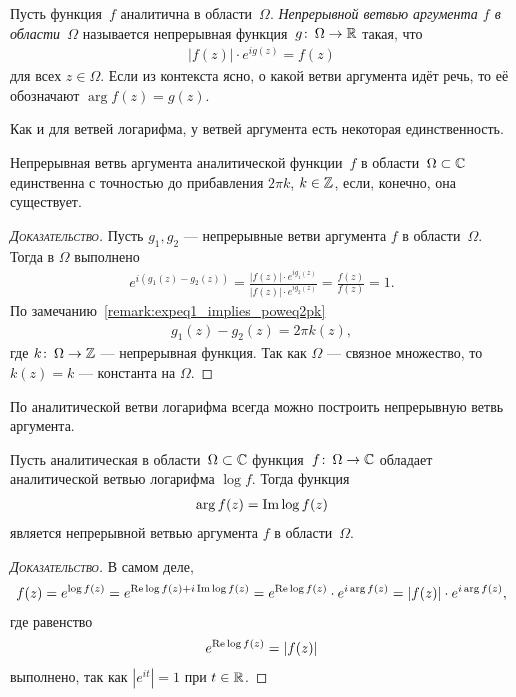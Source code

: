 \documentclass[../complex-analysis.tex]{subfiles}
\begin{document}
\begin{df}
 Пусть функция~$ f $ аналитична в области~$ \Omega $. \textit{Непрерывной ветвью аргумента $ f $ в области~$ \Omega $} называется непрерывная функция~$ g \colon\, \Omega \to \mathbb{R} $ такая, что
 \begin{align*}
  \left| f(z) \right| \cdot e^{i g(z)} = f(z)
 \end{align*} для всех $ z\in\Omega $. Если из контекста ясно, о какой ветви аргумента идёт речь, то её обозначают $ \arg f(z) = g(z) $.
\end{df}

Как и для ветвей логарифма, у ветвей аргумента есть некоторая единственность.

\begin{prop}
 Непрерывная ветвь аргумента аналитической функции~$ f $ в области~$ \Omega \subset \mathbb{C} $ единственна с точностью до прибавления $ 2\pi k $, $ k\in\mathbb{Z} $, если, конечно, она существует.
\end{prop}
\begin{proof}[\normalfont\textsc{Доказательство}]
 Пусть $ g_1,g_2 $ --- непрерывные ветви аргумента $ f $ в области~$ \Omega $. Тогда в $ \Omega $ выполнено
 \begin{align*}
  e^{i(g_1(z) - g_2(z))} = \frac{\left| f(z) \right| \cdot e^{ig_1(z)}}{\left| f(z) \right| \cdot e^{ig_2(z)}} = \frac{f(z)}{f(z)} = 1.
 \end{align*} По замечанию~\ref{remark:expeq1_implies_poweq2pk}
 \begin{align*}
  g_1(z)-g_2(z) = 2\pi k(z),
 \end{align*} где $ k\colon\,\Omega\to\mathbb{Z} $ --- непрерывная функция. Так как $ \Omega $ --- связное множество, то $ k(z) = k $ --- константа на $ \Omega $.
\end{proof}

По аналитической ветви логарифма всегда можно построить непрерывную ветвь аргумента.

\begin{thm}
 \label{theorem:exist_arg_f}
 Пусть аналитическая в области~$ \Omega \subset \mathbb{C} $ функция~$ f\colon\,\Omega\to\mathbb{C} $ обладает аналитической ветвью логарифма $ \log f $. Тогда функция
 \begin{align*}
  \arg f(z) = \operatorname{Im} \log f(z)
 \end{align*} является непрерывной ветвью аргумента $ f $ в области~$ \Omega $.
\end{thm}
\begin{proof}[\normalfont\textsc{Доказательство}]
 В самом деле,
 \begin{align*}
  f(z) = e^{\log f(z)} = e^{\operatorname{Re} \log f(z) + i \operatorname{Im} \log f(z)} = e^{\operatorname{Re} \log f(z)} \cdot e^{i\arg f(z)} = \left| f(z) \right| \cdot e^{i\arg f(z)},
 \end{align*} где равенство
 \begin{align*}
  e^{\operatorname{Re} \log f(z)} = \left| f(z) \right|
 \end{align*} выполнено, так как $ \left| e^{it} \right|=1 $ при $ t \in \mathbb{R} $.
\end{proof}
\end{document}

